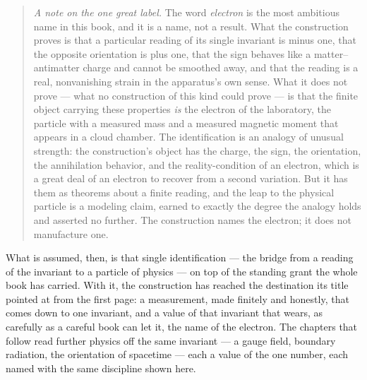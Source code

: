 \begin{quote}
\emph{A note on the one great label.} The word \emph{electron} is the most ambitious name in this book,
and it is a name, not a result. What the construction proves is that a particular reading of its single
invariant is minus one, that the opposite orientation is plus one, that the sign behaves like a
matter--antimatter charge and cannot be smoothed away, and that the reading is a real, nonvanishing
strain in the apparatus's own sense. What it does not prove --- what no construction of this kind could
prove --- is that the finite object carrying these properties \emph{is} the electron of the laboratory,
the particle with a measured mass and a measured magnetic moment that appears in a cloud chamber. The
identification is an analogy of unusual strength: the construction's object has the charge, the sign,
the orientation, the annihilation behavior, and the reality-condition of an electron, which is a great
deal of an electron to recover from a second variation. But it has them as theorems about a finite
reading, and the leap to the physical particle is a modeling claim, earned to exactly the degree the
analogy holds and asserted no further. The construction names the electron; it does not manufacture
one.
\end{quote}

What is assumed, then, is that single identification --- the bridge from a reading of the invariant to a
particle of physics --- on top of the standing grant the whole book has carried. With it, the
construction has reached the destination its title pointed at from the first page: a measurement, made
finitely and honestly, that comes down to one invariant, and a value of that invariant that wears, as
carefully as a careful book can let it, the name of the electron. The chapters that follow read further
physics off the same invariant --- a gauge field, boundary radiation, the orientation of spacetime ---
each a value of the one number, each named with the same discipline shown here.

